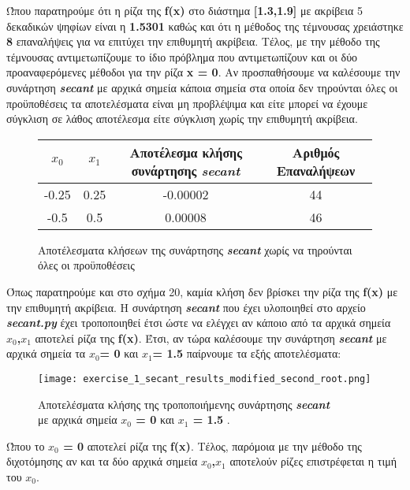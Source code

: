 \documentclass[First Project.tex]{subfiles}
\begin{document}
Ώπου παρατηρούμε ότι η ρίζα της \textlatin{\textbf{f(x)}} στο διάστημα \textlatin{\textbf{[1.3,1.9]}} με ακρίβεια 5 δεκαδικών ψηφίων 
είναι η \textbf{1.5301} καθώς και ότι η μέθοδος της τέμνουσας χρειάστηκε \textbf{8} επαναλήψεις για να επιτύχει την 
επιθυμητή ακρίβεια. Τέλος, με την μέθοδο της τέμνουσας αντιμετωπίζουμε το ίδιο πρόβλημα που αντιμετωπίζουν και οι δύο προαναφερόμενες μέθοδοι
για την ρίζα \textbf{\textlatin{x = 0}}. Αν προσπαθήσουμε να καλέσουμε την συνάρτηση \textit{\textlatin{\textbf{secant}}} με αρχικά 
σημεία κάποια σημεία στα οποία δεν τηρούνται όλες οι προϋποθέσεις τα αποτελέσματα είναι μη προβλέψιμα και είτε μπορεί να έχουμε σύγκλιση σε 
λάθος αποτέλεσμα είτε σύγκλιση χωρίς την επιθυμητή ακρίβεια.
\vspace{10mm}
\begin{figure}[h!]
    \centering
    \captionsetup{justification=centering}
    \begin{center}
        \begin{tabular}{ |c|c|c|c| }       
            \hline
            \textbf{\textlatin{$x_{0}$}} & \textlatin{$x_{1}$} & Αποτέλεσμα κλήσης συνάρτησης \textit{\textlatin{\textbf{secant}}} & Αριθμός Επαναλήψεων \\
            \hline
            -0.25 & 0.25 & -0.00002 & 44 \\
            -0.5 & 0.5 & 0.00008 & 46 \\ [1ex]
            \hline
        \end{tabular}
        \caption{ Αποτέλεσματα κλήσεων της συνάρτησης \textit{\textlatin{\textbf{secant}}} χωρίς να τηρούνται όλες οι προϋποθέσεις}
    \end{center}
\end{figure}

Όπως παρατηρούμε και στο σχήμα 20, καμία κλήση δεν βρίσκει την ρίζα της \textlatin{\textbf{f(x)}} με την επιθυμητή ακρίβεια. Η συνάρτηση 
\textit{\textlatin{\textbf{secant}}} που έχει υλοποιηθεί στο αρχείο \textit{\textlatin{\textbf{secant.py}}} έχει τροποποιηθεί έτσι
ώστε να ελέγχει αν κάποιο από τα αρχικά σημεία \textbf{\textlatin{$x_{0}$,$x_{1}$}} αποτελεί ρίζα της \textlatin{\textbf{f(x)}}. Έτσι, αν τώρα
καλέσουμε την συνάρτηση \textit{\textlatin{\textbf{secant}}} με αρχικά σημεία τα \textlatin{\textbf{$x_{0}$= 0}} και 
\textlatin{\textbf{$x_{1}$= 1.5}} παίρνουμε τα εξής αποτελέσματα:
\vspace{5px}
\begin{figure}[h!]
    \centering
    \captionsetup{justification=centering}
    \begin{center}
    \texttt{[image: exercise\_1\_secant\_results\_modified\_second\_root.png]}    
    \caption{ Αποτελέσματα κλήσης της τροποποιήμενης συνάρτησης \textit{\textlatin{\textbf{secant}}} \\ με αρχικά σημεία 
                \textbf{\textlatin{$x_{0}$ = 0}} και \textbf{\textlatin{$x_{1}$ = 1.5}} . }
    \end{center}
\end{figure}

Ώπου το \textbf{\textlatin{$x_{0}$ = 0}} αποτελεί ρίζα της \textlatin{\textbf{f(x)}}. Τέλος, παρόμοια με την μέθοδο της διχοτόμησης αν και
τα δύο αρχικά σημεία \textbf{\textlatin{$x_{0}$,$x_{1}$}} αποτελούν ρίζες επιστρέφεται η τιμή του \textbf{\textlatin{$x_{0}$}}.

\newpage
\end{document}
